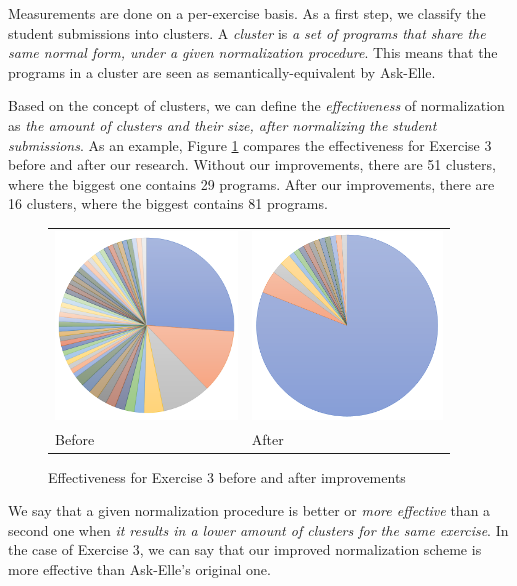 Measurements are done on a per-exercise basis. As a first step, we classify the student submissions into clusters. A \emph{cluster} is \emph{a set of programs that share the same normal form, under a given normalization procedure}. This means that the programs in a cluster are seen as semantically-equivalent by Ask-Elle.

Based on the concept of clusters, we can define the \emph{effectiveness} of normalization as \emph{the amount of clusters and their size, after normalizing the student submissions}. As an example, Figure \ref{fig:method-ex3-clusters} compares the effectiveness for Exercise 3 before and after our research. Without our improvements, there are 51 clusters, where the biggest one contains 29 programs. After our improvements, there are 16 clusters, where the biggest contains 81 programs.

\begin{figure}
\centering
\begin{tabular}{ >{\centering\arraybackslash}m{14em} >{\centering\arraybackslash}m{14em} }
\includegraphics[height=5cm]{graphs/ex3-clusters-original.png}
&
\includegraphics[height=5cm]{graphs/ex3-clusters.png} \\
Before & After
\end{tabular}
\caption{Effectiveness for Exercise 3 before and after improvements}
\label{fig:method-ex3-clusters}
\end{figure}

We say that a given normalization procedure is better or \emph{more effective} than a second one when \emph{it results in a lower amount of clusters for the same exercise}. In the case of Exercise 3, we can say that our improved normalization scheme is more effective than Ask-Elle's original one.

